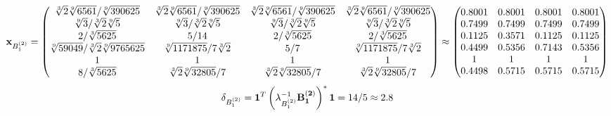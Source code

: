 \documentclass[10pt,a4paper]{article}
\begin{document}
	\[
		\bold{x}_{B_1^{(2)}} = 
		\begin{pmatrix}
			{\sqrt[3]{2}\sqrt[9]{6561}} / {\sqrt[9]{390625}} & {\sqrt[3]{2}\sqrt[9]{6561}} / {\sqrt[9]{390625}} & {\sqrt[3]{2}\sqrt[9]{6561}} / {\sqrt[9]{390625}} & {\sqrt[3]{2}\sqrt[9]{6561}} / {\sqrt[9]{390625}} \\
			{\sqrt[9]{3}} / {\sqrt[3]{2}\sqrt[9]{5}} & {\sqrt[9]{3}} / {\sqrt[3]{2}\sqrt[9]{5}} & {\sqrt[9]{3}} / {\sqrt[3]{2}\sqrt[9]{5}} & {\sqrt[9]{3}} / {\sqrt[3]{2}\sqrt[9]{5}} \\
			{{2}} / {\sqrt[3]{5625}} & {{5}} / {{14}} & {{2}} / {\sqrt[3]{5625}} & {{2}} / {\sqrt[3]{5625}} \\
			{\sqrt[9]{59049}} / {\sqrt[3]{2}\sqrt[9]{9765625}} & {\sqrt[9]{1171875}} / {{7}\sqrt[3]{2}} & {{5}} / {{7}} & {\sqrt[9]{1171875}} / {{7}\sqrt[3]{2}} \\
			{1}{} & {1}{} & {1}{} & {1}{} \\
			{{8}} / {\sqrt[3]{5625}} & {\sqrt[3]{2}\sqrt[9]{32805}} / {{7}} & {\sqrt[3]{2}\sqrt[9]{32805}} / {{7}} & {\sqrt[3]{2}\sqrt[9]{32805}} / {{7}} \\
		\end{pmatrix}
		\approx
		\begin{pmatrix}
			0.8001   & 0.8001   & 0.8001   & 0.8001   \\
			0.7499   & 0.7499   & 0.7499   & 0.7499   \\
			0.1125   & 0.3571   & 0.1125   & 0.1125   \\
			0.4499   & 0.5356   & 0.7143   & 0.5356   \\
			1        & 1        & 1        & 1        \\
			0.4498   & 0.5715   & 0.5715   & 0.5715   \\
		\end{pmatrix}
	\]
	\[
		\delta_{B_1^{(2)}} = \bold{1}^T \left(\lambda_{B_1^{(2)}}^{-1}\bold{B_1^{(2)}}\right)^* \bold{1} = {{14}} / {{5}}\approx 2.8
	\]
\end{document}
